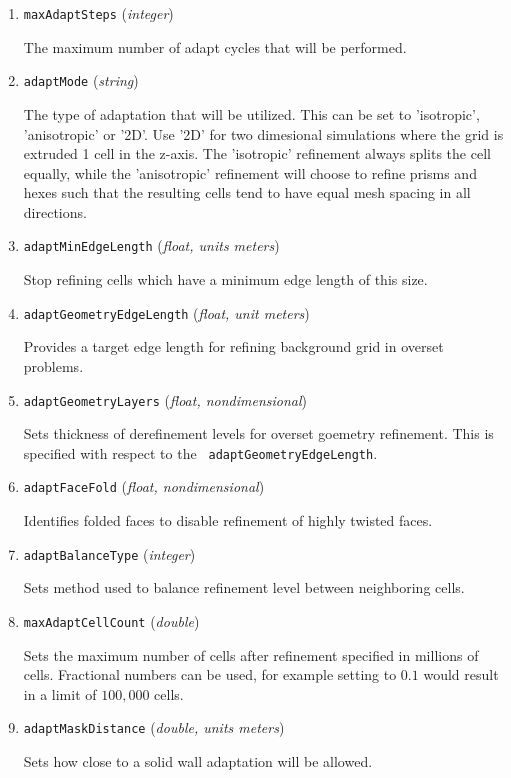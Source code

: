 \begin{enumerate}
\item {\tt maxAdaptSteps}  ({\it integer})

  The maximum number of adapt cycles that will be performed.

\item {\tt adaptMode} ({\it string})

  The type of adaptation that will be utilized. This can be set to
  'isotropic', 'anisotropic' or '2D'.  Use '2D' for two dimesional
  simulations where the grid is extruded 1 cell in the z-axis.  The
  'isotropic' refinement always splits the cell equally, while the
  'anisotropic' refinement will choose to refine prisms and hexes such
  that the resulting cells tend to have equal mesh spacing in all
  directions.  

\item {\tt adaptMinEdgeLength} ({\it float, units meters})

  Stop refining cells which have a minimum edge length of this size.

\item {\tt adaptGeometryEdgeLength} ({\it float, unit meters})

  Provides a target edge length for refining background grid in
  overset problems.

\item {\tt adaptGeometryLayers} ({\it float, nondimensional})

  Sets thickness of derefinement levels for overset goemetry
  refinement.  This is specified with respect to the {\tt
    adaptGeometryEdgeLength}. 

\item {\tt adaptFaceFold} ({\it float, nondimensional})

  Identifies folded faces to disable refinement of highly twisted
  faces.

\item {\tt adaptBalanceType} ({\it integer})

  Sets method used to balance refinement level between neighboring
  cells.

\item {\tt maxAdaptCellCount} ({\it double})

  Sets the maximum number of cells after refinement specified in
  millions of cells.  Fractional numbers can be used, for example
  setting to $0.1$ would result in a limit of $100,000$ cells.
  
\item {\tt adaptMaskDistance} ({\it double, units meters})

  Sets how close to a solid wall adaptation will be allowed.

\end{enumerate}
